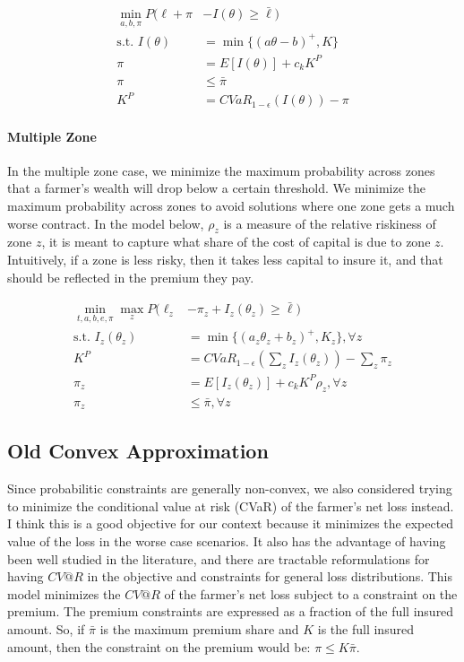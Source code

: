 \documentclass[11pt]{article}
\begin{document}
    \begin{align}
        \min_{a,b,\pi} P(\ell + \pi &-I(\theta) \geq \bar{\ell})\\
        \text{s.t.   } I(\theta) &= \min \{ (a\theta - b)^+,K \}\\
        \pi &= E[I(\theta)] + c_k K^P\\
        \pi &\leq \bar{\pi}\\
        K^P &= CVaR_{1-\epsilon}\left ( I(\theta) \right ) - \pi
    \end{align}

    \paragraph*{Multiple Zone}
    In the multiple zone case, we minimize the maximum probability across zones that a farmer's wealth will drop below a certain threshold. We minimize the maximum probability across zones to avoid solutions where one zone gets a much worse contract. In the model below, $\rho_z$ is a measure of the relative riskiness of zone $z$, it is meant to capture what share of the cost of capital is due to zone $z$. Intuitively, if a zone is less risky, then it takes less capital to insure it, and that should be reflected in the premium they pay. 

    \begin{align}
        \min_{t,a,b,e,\pi} \max_z P(\ell_z &- \pi_z +I_z(\theta_z) \geq \bar{\ell})\\
        \text{s.t.   } I_z(\theta_z) &= \min \{ (a_z\theta_z + b_z)^+,K_z \}, \forall z\\
        K^P &= CVaR_{1-\epsilon}\left (\sum_z I_z(\theta_z) \right ) - \sum_z \pi_z\\
        \pi_z &= E[I_z(\theta_z)]+c_k K^P \rho_z, \forall z \\
        \pi_z &\leq \bar{\pi}, \forall z
    \end{align}

    \subsection{Old Convex Approximation}
    Since probabilitic constraints are generally non-convex, we also considered trying to minimize the conditional value at risk (CVaR) of the farmer's net loss instead. I think this is a good objective for our context because it minimizes the expected value of the loss in the worse case scenarios. It also has the advantage of having been well studied in the literature, and there are tractable reformulations for having $CV@R$ in the objective and constraints for general loss distributions. This model minimizes the $CV@R$ of the farmer's net loss subject to a constraint on the premium. The premium constraints are expressed as a fraction of the full insured amount. So, if $\bar{\pi}$ is the maximum premium share and $K$ is the full insured amount, then the constraint on the premium would be: $\pi \leq K \bar{\pi}$.
\end{document}
